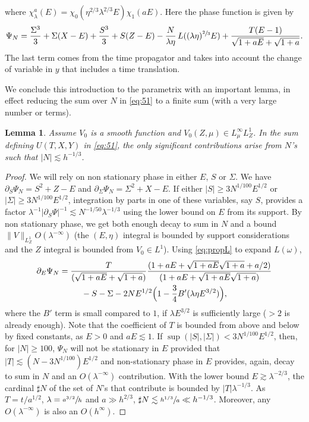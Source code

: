 \documentclass[11pt]{article}
\theoremstyle{plain}
\newtheorem{lemma}{Lemma}
\theoremstyle{definition}
\begin{document}
where $\chi_{\lambda}^{a}(E)=\chi_{0}(\eta^{2/3} \lambda^{2/3} E)\chi_{1}(a E)$. Here the phase function is given by
\begin{equation*}
\label{eq:52}
\Psi_{N}=\frac{\Sigma^{3}}3 +\Sigma(X-E)+\frac {S^{3}} 3+S({Z}-E)-\frac N{\lambda \eta}\, L((\lambda \eta)^{\sfrac 2 3} E)+\frac { T(E-1)}{\sqrt {1+a E}+\sqrt{1+a}}.
\end{equation*}
The last term comes from the time propagator and takes into account the change of variable in $y$ that includes a time translation.

We conclude this introduction to the parametrix with an important lemma, in effect reducing the sum over $N$ in \eqref{eq:51} to a finite sum (with a very large number or terms).
\begin{lemma}\label{sumNfinie}
Assume $V_{0}$ is a smooth function and $V_{0}(Z,\mu)\in L^{\infty}_{\mu}L^{1}_{Z}$. In the sum defining $U(T,X,Y)$ in \eqref{eq:51}, the only significant contributions arise from $N$'s such that $|N|\lesssim h^{-1/3}$.
\end{lemma}
\begin{proof}
We will rely on non stationary phase in either $E$, $S$ or $\Sigma$. We have $\partial_{S}\Psi_{N}=S^{2}+Z-E$ and $\partial_{\Sigma}\Psi_{N}=\Sigma^{2}+X-E$. If either $|S|\geq 3 N^{1/100} E^{1/2} $ or $|\Sigma|\geq 3 N^{1/100}E^{1/2}$, integration by parts in one of these variables, say $S$, provides a factor $\lambda^{-1}|\partial_{S} \Psi|^{-1}\lesssim N^{-1/50}\lambda^{-1/3}$ using the lower bound on $E$ from its support. By non stationary phase, we get both enough decay to sum in $N$ and a bound $\|V\|_{L^{1}_{Z}} O(\lambda^{-\infty})$ (the $(E,\eta)$ integral is bounded by support considerations and the $Z$ integral is bounded from $V_{0}\in L^{1}$). Using \eqref{eq:propL} to expand $L(\omega)$,
\begin{multline*}
\partial_{E}\Psi_{N}=\frac T {(\sqrt{1+aE}+\sqrt{1+a})}\frac{(1+aE+\sqrt{1+aE}\sqrt{1+a} +a/2)}{(1+aE +\sqrt{1+aE}\sqrt{1+a})} \\
{}-S -\Sigma-2NE^{1/2}\Bigl(1-\frac 3 4 B'(\lambda \eta E^{3/2}) \Bigr),
\end{multline*}
where the $B'$ term is small compared to $1$, if $\lambda E^{3/2}$ is sufficiently large ($>2$ is already enough). Note that the coefficient of $T$ is bounded from above and below by fixed constants, as $E>0$ and $aE\lesssim 1$.
If $\sup(|S|,|\Sigma|)<3 N^{1/100}E^{1/2}$, then, for $|N|\geq 100$, $\Psi_{N}$ will not be stationary in $E$ provided that $|T|\lesssim (N-3N^{1/100}) E^{1/2} $ and non-stationary phase in $E$ provides, again, decay to sum in $N$ and an $O(\lambda^{-\infty})$ contribution. With the lower bound $E\gtrsim \lambda^{-2/3}$, the cardinal $\sharp N$ of the set of $N$'s that contribute is bounded by $|T| \lambda^{-1/3}$. As $T=t/a^{1/2}$, $\lambda=\sfrac{a^{3/2}}{h}$ and $a\gg h^{2/3}$, $\sharp N\lesssim \sfrac{h^{1/3}}{a}\ll h^{-1/3}$. Moreover, any $O(\lambda^{-\infty})$ is also an $O(h^{\infty})$. \end{proof}
\end{document}
